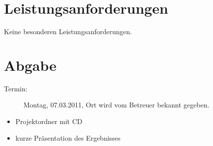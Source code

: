 \documentclass[	a4paper,		%
		titlepage, 		%
		fontsize=12pt		%
		]{scrartcl} 		%
\begin{document}
\section{Leistungsanforderungen}
Keine besonderen Leistungsanforderungen.

\section{Abgabe}
\begin{description}
 \item[Termin:] Montag, 07.03.2011, Ort wird vom Betreuer bekannt gegeben.
 \end{description}
\begin{itemize}
 \item Projektordner mit CD
 \item kurze Präsentation des Ergebnisses
\end{itemize}




%
%

\end{document}

